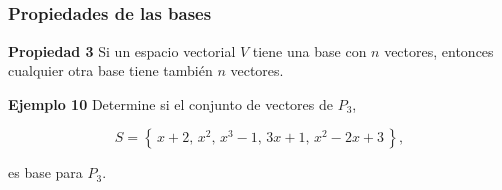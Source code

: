 
\subsection{}

\begin{frame}\frametitle{Propiedades de las bases}
	
	\begin{prop}{\textbf{Propiedad 3}}\justifying
		Si un espacio vectorial $V$ tiene una base con $n$ vectores, entonces cualquier otra base tiene también $n$ vectores.
	\end{prop}	
		
	\begin{ej}{\textbf{Ejemplo 10}} \justifying
		Determine si el conjunto de vectores de $P_3$,
		
		\vspace{-2mm}
		\[
		S = \left\{ \, x+2,\, x^2,\, x^3-1,\, 3x+1,\, x^2-2x+3 \, \right\},
		\]
		
		\vspace{-1mm}
		es base para $P_3$.
	\end{ej}	
	
\end{frame}


